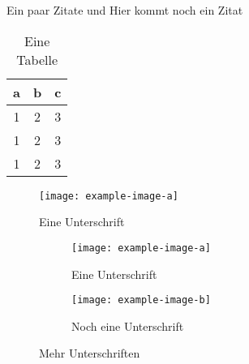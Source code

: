Ein paar Zitate \cite{Hartley2004} und \cite{Bishop2006} Hier kommt noch ein Zitat 
\cite{DorrChristopherH.2015SSBo}

\begin{table}[ht]
	\centering
	\begin{tabular}{c|c|c}
		a & b & c \\ \hline
		1 & 2 & 3 \\
		1 & 2 & 3 \\
		1 & 2 & 3
	\end{tabular}
	\caption{Eine Tabelle}
\end{table}

\begin{figure}[ht]
	\centering
	\texttt{[image: example-image-a]}
	\caption{Eine Unterschrift}
\end{figure}

\begin{figure}[ht]
	\centering
	\begin{subfigure}[b]{0.45\textwidth}
		\texttt{[image: example-image-a]}
		\caption{Eine Unterschrift}
	\end{subfigure} \hfill
	\begin{subfigure}[b]{0.45\textwidth}
		\texttt{[image: example-image-b]}
		\caption{Noch eine Unterschrift}
	\end{subfigure}
	\caption{Mehr Unterschriften}
\end{figure}



